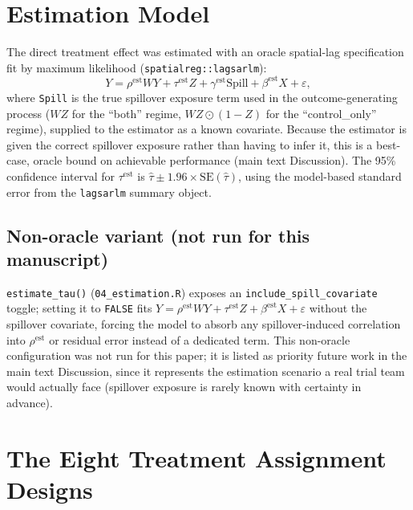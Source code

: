 \documentclass[11pt]{article}
\begin{document}
\section{Estimation Model}
\label{sec:s4}

The direct treatment effect was estimated with an oracle spatial-lag
specification fit by maximum likelihood (\texttt{spatialreg::lagsarlm}):
\[
Y = \rho^{\text{est}} W Y + \tau^{\text{est}} Z + \gamma^{\text{est}} \text{Spill} + \beta^{\text{est}} X + \varepsilon,
\]
where \texttt{Spill} is the true spillover exposure term used in the outcome-generating
process ($WZ$ for the ``both'' regime, $WZ \odot (1-Z)$ for the ``control\_only''
regime), supplied to the estimator as a known covariate. Because the estimator is
given the correct spillover exposure rather than having to infer it, this is a
best-case, oracle bound on achievable performance (main text Discussion). The 95\%
confidence interval for $\tau^{\text{est}}$ is $\hat\tau \pm 1.96 \times
\text{SE}(\hat\tau)$, using the model-based standard error from the
\texttt{lagsarlm} summary object.

\subsection*{Non-oracle variant (not run for this manuscript)}

\texttt{estimate\_tau()} (\texttt{04\_estimation.R}) exposes an
\texttt{include\_spill\_covariate} toggle; setting it to \texttt{FALSE} fits
$Y = \rho^{\text{est}} W Y + \tau^{\text{est}} Z + \beta^{\text{est}} X +
\varepsilon$ without the spillover covariate, forcing the model to absorb any
spillover-induced correlation into $\rho^{\text{est}}$ or residual error instead
of a dedicated term. This non-oracle configuration was not run for this paper;
it is listed as priority future work in the main text Discussion, since it
represents the estimation scenario a real trial team would actually face
(spillover exposure is rarely known with certainty in advance).

\section{The Eight Treatment Assignment Designs}
\label{sec:s5}
\end{document}
